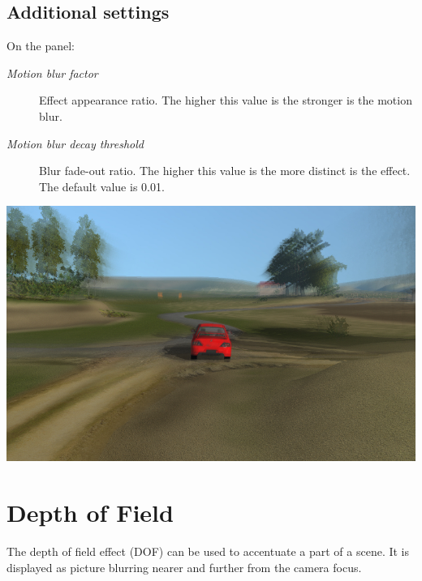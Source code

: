 \documentclass[a4paper,12pt,oneside]{sphinxmanual}
\begin{document}
\subsection{Additional settings}
\label{postprocessing_effects:id4}
On the  panel:
\begin{description}
\item[{\emph{Motion blur factor}}] \leavevmode
Effect appearance ratio. The higher this value is the stronger is the motion blur.

\item[{\emph{Motion blur decay threshold}}] \leavevmode
Blur fade-out ratio. The higher this value is the more distinct is the effect. The default value is 0.01.

\end{description}

{\hfill\includegraphics[width=1.000\linewidth]{motion_blur.jpg}\hfill}

\begin{DUlineblock}{0em}
\item[] 
\end{DUlineblock}


\section{Depth of Field}
\label{postprocessing_effects:id5}\label{postprocessing_effects:dof}\label{postprocessing_effects:index-1}
The depth of field effect (DOF) can be used to accentuate a part of a scene. It is displayed as picture blurring nearer and further from the camera focus.
\end{document}
